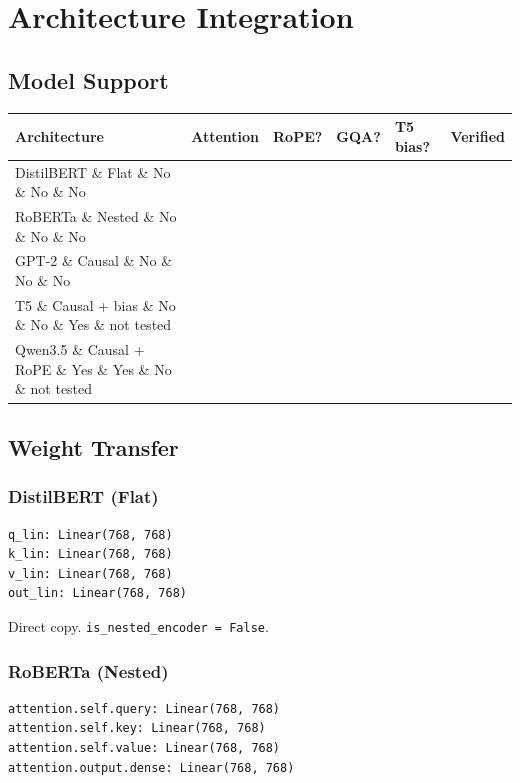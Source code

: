
\section{Architecture Integration}

\subsection{Model Support}

\begin{table}[H]
\centering
\small
\begin{tabular}{llllll}
\toprule
\textbf{Architecture} & \textbf{Attention} & \textbf{RoPE?} & \textbf{GQA?} & \textbf{T5 bias?} & \textbf{Verified} \\
\midrule
DistilBERT \& Flat \& No \& No \& No &  \\
RoBERTa \& Nested \& No \& No \& No &  \\
GPT-2 \& Causal \& No \& No \& No &  \\
T5 \& Causal + bias \& No \& No \& Yes \& not tested \\
Qwen3.5 \& Causal + RoPE \& Yes \& Yes \& No \& not tested \\
\bottomrule
\end{tabular}
\end{table}

\subsection{Weight Transfer}

\subsubsection{DistilBERT (Flat)}

\begin{lstlisting}
q_lin: Linear(768, 768)
k_lin: Linear(768, 768)
v_lin: Linear(768, 768)
out_lin: Linear(768, 768)
\end{lstlisting}

Direct copy. \texttt{is\_nested\_encoder = False}.

\subsubsection{RoBERTa (Nested)}

\begin{lstlisting}
attention.self.query: Linear(768, 768)
attention.self.key: Linear(768, 768)
attention.self.value: Linear(768, 768)
attention.output.dense: Linear(768, 768)
\end{lstlisting}

